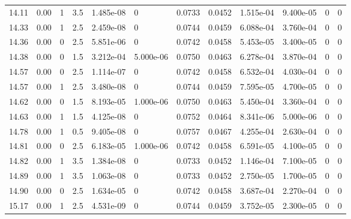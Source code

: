 \documentclass[preview]{standalone}
\begin{document}
{{{{{\begin{tabular}{L{1.2cm}C{1.2cm} C{0.3cm}C{0.5cm} C{1.4cm}C{1.4cm} C{1.4cm}C{1.4cm} C{1.6cm}C{1.6cm} C{1.6cm}C{1.6cm}}
  14.11  &  0.00  & 1     & 3.5 &  1.485e-08  & 0  &  0.0733&   0.0452& 1.515e-04 & 9.400e-05   &  0 & 0  \\ 
  14.33  &  0.00  & 1     & 2.5 &  2.459e-08  & 0  &  0.0744&   0.0459& 6.088e-04 & 3.760e-04   &  0 & 0  \\ 
  14.36  &  0.00  & 0     & 2.5 &  5.851e-06  & 0  &  0.0742&   0.0458& 5.453e-05 & 3.400e-05   &  0 & 0  \\ 
  14.38  &  0.00  & 0     & 1.5 &  3.212e-04  & 5.000e-06  &  0.0750&   0.0463& 6.278e-04 & 3.870e-04   &  0 & 0  \\ 
  14.57  &  0.00  & 0     & 2.5 &  1.114e-07  & 0  &  0.0742&   0.0458& 6.532e-04 & 4.030e-04   &  0 & 0  \\ 
  14.57  &  0.00  & 1     & 2.5 &  3.480e-08  & 0  &  0.0744&   0.0459& 7.595e-05 & 4.700e-05   &  0 & 0  \\ 
  14.62  &  0.00  & 0     & 1.5 &  8.193e-05  & 1.000e-06  &  0.0750&   0.0463& 5.450e-04 & 3.360e-04   &  0 & 0  \\ 
  14.63  &  0.00  & 1     & 1.5 &  4.125e-08  & 0  &  0.0752&   0.0464& 8.341e-06 & 5.000e-06   &  0 & 0  \\ 
  14.78  &  0.00  & 1     & 0.5 &  9.405e-08  & 0  &  0.0757&   0.0467& 4.255e-04 & 2.630e-04   &  0 & 0  \\ 
  14.81  &  0.00  & 0     & 2.5 &  6.183e-05  & 1.000e-06  &  0.0742&   0.0458& 6.591e-05 & 4.100e-05   &  0 & 0  \\ 
  14.82  &  0.00  & 1     & 3.5 &  1.384e-08  & 0  &  0.0733&   0.0452& 1.146e-04 & 7.100e-05   &  0 & 0  \\ 
  14.89  &  0.00  & 1     & 3.5 &  1.063e-08  & 0  &  0.0733&   0.0452& 2.750e-05 & 1.700e-05   &  0 & 0  \\ 
  14.90  &  0.00  & 0     & 2.5 &  1.634e-05  & 0  &  0.0742&   0.0458& 3.687e-04 & 2.270e-04   &  0 & 0  \\ 
  15.17  &  0.00  & 1     & 2.5 &  4.531e-09  & 0  &  0.0744&   0.0459& 3.752e-05 & 2.300e-05   &  0 & 0  \\ 
\hline 
\end{tabular} 

}}}}}
\end{document}

